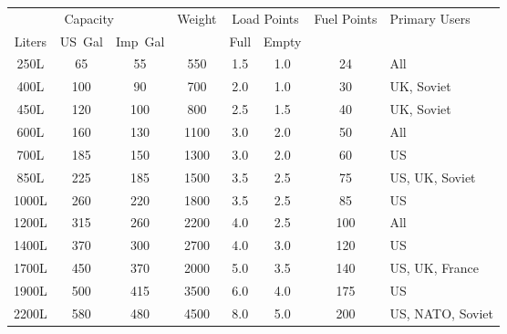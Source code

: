 \begin{twocolumntablefloat}
\begin{twocolumntable}
{
\begin{tabular}{cccccccl}
\toprule
\multicolumn{3}{c}{Capacity}&
Weight&
\multicolumn{2}{c}{Load Points}&
Fuel Points&
Primary Users\\
\cmidrule{1-3}
\cmidrule{5-6}
Liters&US~Gal&Imp~Gal&&Full&Empty&&\\
\midrule
\phantom{0}250L&\phantom{0}65&\phantom{0}55&\phantom{0}550&1.5&1.0&\phantom{0}24&All\\
\phantom{0}400L&\phantom{}100&\phantom{0}90&\phantom{0}700&2.0&1.0&\phantom{0}30&UK, Soviet\\
\phantom{0}450L&\phantom{}120&\phantom{}100&\phantom{0}800&2.5&1.5&\phantom{0}40&UK, Soviet\\
\phantom{0}600L&\phantom{}160&\phantom{0}130&\phantom{}1100&3.0&2.0&\phantom{0}50&All\\
\phantom{0}700L&\phantom{}185&\phantom{0}150&\phantom{}1300&3.0&2.0&\phantom{0}60&US\\
\phantom{0}850L&\phantom{}225&\phantom{0}185&\phantom{}1500&3.5&2.5&\phantom{0}75&US, UK, Soviet\\
\phantom{}1000L&\phantom{}260&\phantom{0}220&\phantom{}1800&3.5&2.5&\phantom{0}85&US\\
\phantom{}1200L&\phantom{}315&\phantom{0}260&\phantom{}2200&4.0&2.5&\phantom{}100&All\\
\phantom{}1400L&\phantom{}370&\phantom{0}300&\phantom{}2700&4.0&3.0&\phantom{}120&US\\
\phantom{}1700L&\phantom{}450&\phantom{0}370&\phantom{}2000&5.0&3.5&\phantom{}140&US, UK, France\\
\phantom{}1900L&\phantom{}500&\phantom{0}415&\phantom{}3500&6.0&4.0&\phantom{}175&US\\
\phantom{}2200L&\phantom{}580&\phantom{0}480&\phantom{}4500&8.0&5.0&\phantom{}200&US, NATO, Soviet\\
\bottomrule
\end{tabular}

}
\end{twocolumntable}
\end{twocolumntablefloat}